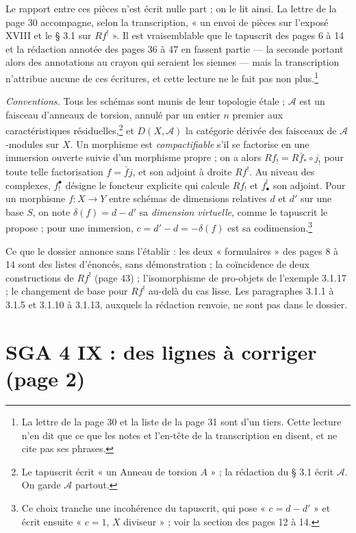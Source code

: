 \documentclass[11pt,a4paper]{article}
\begin{document}
Le rapport entre ces pièces n'est écrit nulle part ; on le lit ainsi. La
lettre de la page 30 accompagne, selon la transcription, « un envoi de
pièces sur l'exposé XVIII et le § 3.1 sur $Rf^!$ ». Il est vraisemblable que
le tapuscrit des pages 6 à 14 et la rédaction annotée des pages 36 à 47 en
fassent partie --- la seconde portant alors des annotations au crayon qui
seraient les siennes --- mais la transcription n'attribue aucune de ces
écritures, et cette lecture ne le fait pas non plus.\footnote{La lettre de la
page 30 et la liste de la page 31 sont d'un tiers. Cette lecture n'en dit que
ce que les notes et l'en-tête de la transcription en disent, et ne cite pas
ses phrases.}

\emph{Conventions.} Tous les schémas sont munis de leur topologie étale ;
$\mathcal{A}$ est un faisceau d'anneaux de torsion, annulé par un entier $n$
premier aux caractéristiques résiduelles,\footnote{Le tapuscrit écrit « un
Anneau de torsion $A$ » ; la rédaction du § 3.1 écrit $\mathcal{A}$. On garde
$\mathcal{A}$ partout.} et $D(X, \mathcal{A})$ la catégorie dérivée des
faisceaux de $\mathcal{A}$-modules sur $X$. Un morphisme est
\emph{compactifiable} s'il se factorise en une immersion ouverte suivie d'un
morphisme propre ; on a alors $Rf_! = R\bar f_* \circ j_!$ pour toute telle
factorisation $f = \bar f j$, et son adjoint à droite $Rf^!$.
Au niveau des complexes, $f_!^{\bullet}$ désigne le foncteur explicite qui
calcule $Rf_!$ et $f^!_{\bullet}$ son adjoint. Pour un morphisme $f\colon X
\to Y$ entre schémas de dimensions relatives $d$ et $d'$ sur une base $S$, on
note $\delta(f) = d - d'$ sa \emph{dimension virtuelle}, comme le tapuscrit le
propose ; pour une immersion, $c = d' - d = -\delta(f)$ est sa
codimension.\footnote{Ce choix tranche une incohérence du tapuscrit, qui pose
« $c = d - d'$ » et écrit ensuite « $c = 1$, $X$ diviseur » ; voir la section
des pages 12 à 14.}

Ce que le dossier annonce sans l'établir : les deux « formulaires » des
pages 8 à 14 sont des listes d'énoncés, sans démonstration ; la coïncidence de
deux constructions de $Rf^!$ (page 43) ; l'isomorphisme de pro-objets de
l'exemple 3.1.17 ; le changement de base pour $Rf^!$ au-delà du cas lisse.
Les paragraphes 3.1.1 à 3.1.5 et 3.1.10 à 3.1.13, auxquels la rédaction
renvoie, ne sont pas dans le dossier.

\section*{SGA 4 IX : des lignes à corriger (page 2)}
\end{document}

